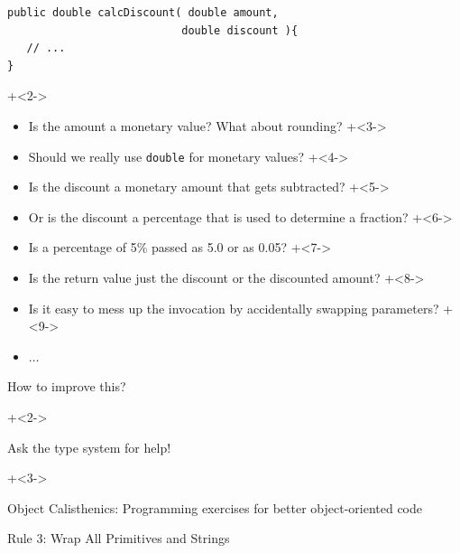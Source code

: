 \begin{frame}[fragile]{}

\begin{lstlisting}
public double calcDiscount( double amount, 
                           double discount ){
   // ...
}
\end{lstlisting}

\onslide+<2->

\begin{itemize}
\item Is the amount a monetary value? What about rounding?
\onslide+<3->
\item Should we really use \texttt{double} for monetary values?
\onslide+<4->
\item Is the discount a monetary amount that gets subtracted?
\onslide+<5->
\item Or is the discount a percentage that is used to determine a fraction?
\onslide+<6->
\item Is a percentage of 5\% passed as 5.0 or as 0.05?
\onslide+<7->
\item Is the return value just the discount or the discounted amount?
\onslide+<8->
\item Is it easy to mess up the invocation by accidentally swapping parameters?
\onslide+<9->
\item $\ldots$
\end{itemize}

\end{frame}


\begin{frame}[fragile]{How to improve this?}

\onslide+<2->

{
\huge
Ask the type system for help!
}

\onslide+<3->

\vspace{4em}
Object Calisthenics: Programming exercises for better object-oriented code

\vspace{1em}
Rule 3: Wrap All Primitives and Strings

\end{frame}

